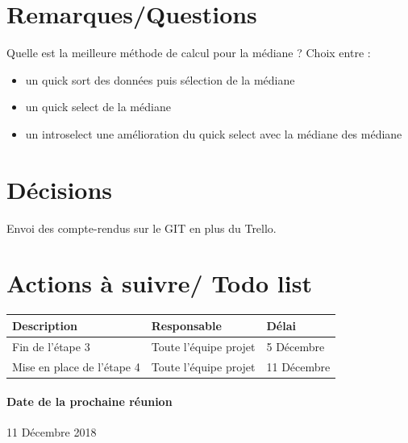 \documentclass{article}
\begin{document}
\section{Remarques/Questions}
Quelle est la meilleure méthode de calcul pour la médiane ? 
Choix entre :
\begin{itemize}
  \item un quick sort des données puis sélection de la médiane 
  \item un quick select de la médiane 
  \item un introselect
  \itme une amélioration du quick select avec la médiane des médiane 
\end{itemize}

\section{Décisions}
Envoi des compte-rendus sur le GIT en plus du Trello.

\section{Actions à suivre/ Todo list}

\begin{tabular}{|C{5cm}|C{3cm}|C{3cm}|}
\hline {} Description & Responsable & Délai \\
\hline  Fin de l'étape 3 & Toute l'équipe projet  & 5 Décembre  \\
\hline 
Mise en place de l'étape 4 & Toute l'équipe projet  & 11 Décembre \\
\hline
\end{tabular}

\paragraph{Date de la prochaine réunion}
11 Décembre 2018
\end{document}
